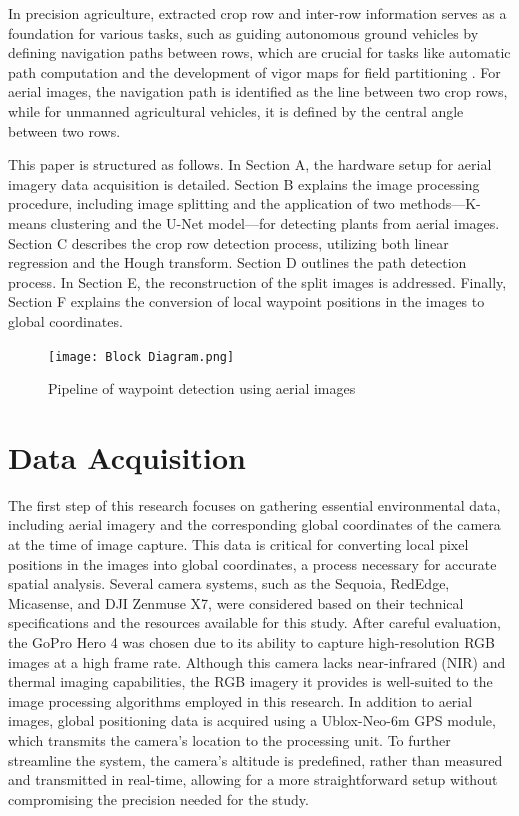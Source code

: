 \documentclass[conference]{IEEEtran}
\begin{document}
In precision agriculture, extracted crop row and inter-row information serves as a foundation for various tasks, such as guiding autonomous ground vehicles by defining navigation paths between rows, which are crucial for tasks like automatic path computation and the development of vigor maps for field partitioning \cite{b11}. For aerial images, the navigation path is identified as the line between two crop rows, while for unmanned agricultural vehicles, it is defined by the central angle between two rows\cite{b1}.

This paper is structured as follows. In Section A, the hardware setup for aerial imagery data acquisition is detailed. Section B explains the image processing procedure, including image splitting and the application of two methods—K-means clustering and the U-Net model—for detecting plants from aerial images. Section C describes the crop row detection process, utilizing both linear regression and the Hough transform. Section D outlines the path detection process. In Section E, the reconstruction of the split images is addressed. Finally, Section F explains the conversion of local waypoint positions in the images to global coordinates.

\begin{figure}[htbp]
\texttt{[image: Block Diagram.png]}
\caption{Pipeline of waypoint detection using aerial images}
\label{fig1}
\end{figure}

\section{Data Acquisition}
The first step of this research focuses on gathering essential environmental data, including aerial imagery and the corresponding global coordinates of the camera at the time of image capture. This data is critical for converting local pixel positions in the images into global coordinates, a process necessary for accurate spatial analysis.
Several camera systems, such as the Sequoia, RedEdge, Micasense, and DJI Zenmuse X7, were considered based on their technical specifications and the resources available for this study. After careful evaluation, the GoPro Hero 4 was chosen due to its ability to capture high-resolution RGB images at a high frame rate. Although this camera lacks near-infrared (NIR) and thermal imaging capabilities, the RGB imagery it provides is well-suited to the image processing algorithms employed in this research.
In addition to aerial images, global positioning data is acquired using a Ublox-Neo-6m GPS module, which transmits the camera’s location to the processing unit. To further streamline the system, the camera's altitude is predefined, rather than measured and transmitted in real-time, allowing for a more straightforward setup without compromising the precision needed for the study.
\end{document}

